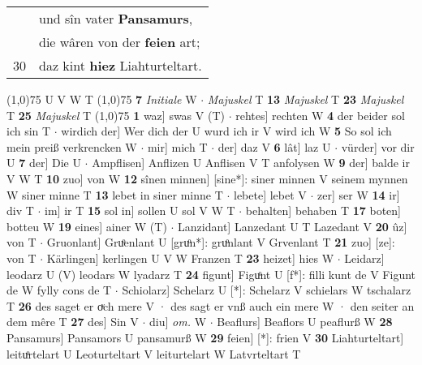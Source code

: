 \documentclass[8pt,a4paper,notitlepage]{article}
\begin{document}
\begin{table}[ht]
\begin{minipage}[t]{0.5\linewidth}
\begin{tabular}{rl}
 & und sîn vater \textbf{Pansamurs},\\ 
 & die wâren von der \textbf{feien} art;\\ 
30 & daz kint \textbf{hiez} Liahturteltart.\\ 
\end{tabular}
\scriptsize
\line(1,0){75} \newline
U V W T \newline
\line(1,0){75} \newline
\textbf{7} \textit{Initiale} W   $\cdot$ \textit{Majuskel} T  \textbf{13} \textit{Majuskel} T  \textbf{23} \textit{Majuskel} T  \textbf{25} \textit{Majuskel} T  \newline
\line(1,0){75} \newline
\textbf{1} waz] swas V (T)  $\cdot$ rehtes] rechten W \textbf{4} der beider sol ich sin T  $\cdot$ wirdich der] Wer dich der U wurd ich ir V wird ich W \textbf{5} So sol ich mein preiß verkrencken W  $\cdot$ mir] mich T  $\cdot$ der] daz V \textbf{6} lât] laz U  $\cdot$ vürder] vor dir U \textbf{7} der] Die U  $\cdot$ Ampflisen] Anflizen U Anflisen V T anfolysen W \textbf{9} der] balde ir V W T \textbf{10} zuo] von W \textbf{12} sînen minnen] [sine*]: siner minnen V seinem mynnen W siner minne T \textbf{13} lebet in siner minne T  $\cdot$ lebete] lebet V  $\cdot$ zer] ser W \textbf{14} ir] div T  $\cdot$ im] ir T \textbf{15} sol in] sollen U sol V W T  $\cdot$ behalten] behaben T \textbf{17} boten] botteu W \textbf{19} eines] ainer W (T)  $\cdot$ Lanzidant] Lanzedant U T Lazedant V \textbf{20} ûz] von T  $\cdot$ Gruonlant] Gruͦenlant U [gruͦn*]: gruͦnlant V Grvenlant T \textbf{21} zuo] [ze]: von T  $\cdot$ Kärlingen] kerlingen U V W Franzen T \textbf{23} heizet] hies W  $\cdot$ Leidarz] leodarz U (V) leodars W lyadarz T \textbf{24} figunt] Figuͦnt U [f*]: filli kunt de  V Figunt de W fylly cons de T  $\cdot$ Schiolarz] Schelarz U [*]: Schelarz V schielars W tschalarz T \textbf{26} des saget er oͮch mere V · des sagt er vnß auch ein mere W · den seiter an dem mêre T \textbf{27} des] Sin V  $\cdot$ diu] \textit{om.} W  $\cdot$ Beaflurs] Beaflors U peaflurß W \textbf{28} Pansamurs] Pansamors U pansamurß W \textbf{29} feien] [*]: frien V \textbf{30} Liahturteltart] leituͦrtelart U Leoturteltart V leiturtelart W Latvrteltart T \newline
\end{minipage}
\end{table}
\end{document}
